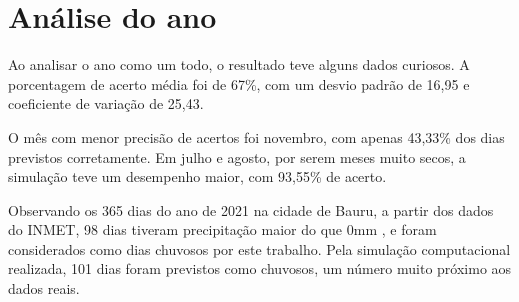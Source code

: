 \section{Análise do ano}
Ao analisar o ano como um todo, o resultado teve alguns dados curiosos. A porcentagem de acerto média foi de 67\%, com um desvio padrão de 16,95 e coeficiente de variação de 25,43.

O mês com menor precisão de acertos foi novembro, com apenas 43,33\% dos dias previstos corretamente. Em julho e agosto, por serem meses muito secos, a simulação teve um desempenho maior, com 93,55\% de acerto.

Observando os 365 dias do ano de 2021 na cidade de Bauru, a partir dos dados do INMET, 98 dias tiveram precipitação maior do que 0mm \cite{inmet}, e foram considerados como dias chuvosos por este trabalho. Pela simulação computacional realizada, 101 dias foram previstos como chuvosos, um número muito próximo aos dados reais.